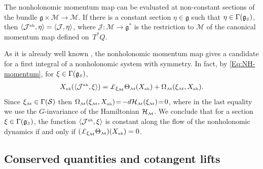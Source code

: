 \documentclass[10pt,a4paper]{amsart}
\numberwithin{equation}{section}
\def\M{\mathcal{M}}
\def\J{\mathcal{J}}
\def\S{\mathcal{S}}
\def\Ham{\mathcal{H}}
\def\g{\mathfrak{g}}
\def\nh{{\mbox{\tiny{nh}}}}
\def\subM{{\mbox{\tiny{$\M$}}}}
\def\subSS{{\mbox{\tiny{$S$}}}}
\begin{document}
\begin{Remark}
 The nonholonomic momentum map can be evaluated at non-constant sections
 of the bundle $\mathfrak{g}\times \M \to \M$.  If there is a constant section
 $\eta \in \mathfrak{g}$ such that $\eta \in \Gamma(\g_\subSS)$, then $\langle \J^{\nh} , \eta \rangle = \langle {\mathcal J} ,
 \eta \rangle $, where ${\mathcal J}\colon \M \to \mathfrak{g}^*$ is the restriction to $\M$
 of the canonical momentum map def\/ined on~$T^*Q$.
\end{Remark}

As it is already well known \cite{BGMConservation,Cortes,FSG2008}, the nonholonomic momentum
map gives a candidate for a f\/irst integral of a nonholonomic system with symmetry.
In fact, by \eqref{Eq:NH-momentum}, for $\xi\in\Gamma(\g_\subSS)$,
\begin{gather}\label{Eq:ConservedNHmom}
X_\nh(\langle {\mathcal J}^{\nh} , \xi  \rangle) = \pounds_{\xi_\M}  \Theta_\subM (X_\nh) + \Omega_\subM(\xi_\subM, X_\nh).
\end{gather}
Since $\xi_\subM\in \Gamma(\S)$ then $\Omega_\subM(\xi_\subM, X_\nh)\! =\!
- d\Ham_\subM (\xi_\subM)\! =\! 0$, where in the last equality we use the
$G$-in\-va\-riance of the Hamiltonian $\Ham_\subM$. We conclude that for
a section $\xi\in\Gamma(\g_\subSS)$, the function $\langle {\mathcal J}^{\nh} , \xi \rangle$
is constant along the f\/low of the nonholonomic dynamics if and only if
\mbox{$(\pounds_{\xi_\M}\Theta_\subM) (X_\nh)  = 0$}.

\subsection{Conserved quantities and cotangent lifts}\label{Ss:Cotangent}
\end{document}
